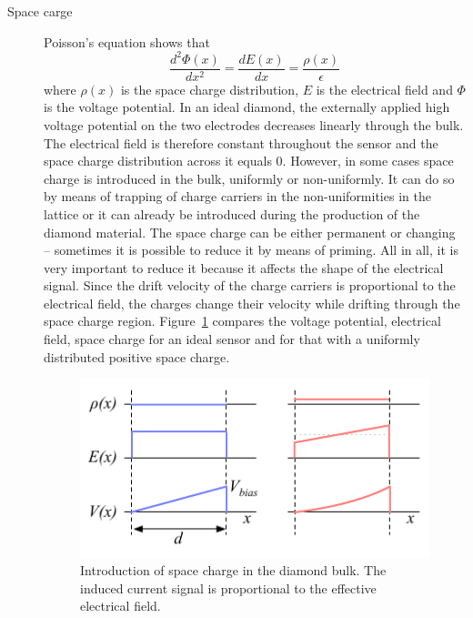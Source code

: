 \documentclass[twoside,12pt]{packages/mytustyle}  %
\begin{document}
\begin{description}
\item[Space carge] 
Poisson's equation shows that 
\begin{equation}
\label{eq:poisson}
\frac{d^2\Phi(x)}{dx^2} = \frac{dE(x)}{dx} = \frac{\rho(x)}{\epsilon}
\end{equation}
where $\rho(x)$ is the space charge distribution, $E$ is the electrical field and $\Phi$ is the voltage potential. In an ideal diamond, the externally applied high voltage potential on the two electrodes decreases linearly through the bulk. The electrical field is therefore constant throughout the sensor and the space charge distribution across it equals 0. However, in some cases space charge is introduced in the bulk, uniformly or non-uniformly. It can do so by means of trapping of charge carriers in the non-uniformities in the lattice or it can already be introduced during the production of the diamond material. The space charge can be either permanent or changing -- sometimes it is possible to reduce it by means of priming. All in all, it is very important to reduce it because it affects the shape of the electrical signal. Since the drift velocity of the charge carriers is proportional to the electrical field, the charges change their velocity while drifting through the space charge region. Figure~\ref{fig:spcchg} compares the voltage potential, electrical field, space charge for an ideal sensor and for that with a uniformly distributed positive space charge.
\begin{figure}[!t]
\begin{center}
\includegraphics[width=0.6\linewidth]{plots/spcchg}
\caption{Introduction of space charge in the diamond bulk. The induced current signal is proportional to the effective electrical field.}
\label{fig:spcchg}
\end{center}
\end{figure}



\end{description}
\end{document}
